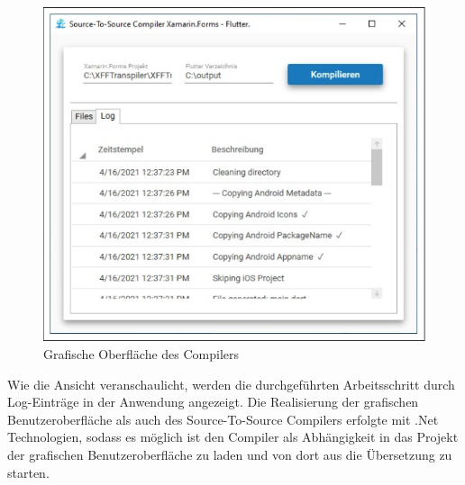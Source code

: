 \begin{figure}[!ht]
 \includegraphics[width=\textwidth,keepaspectratio]{Images/Implementation/UiScreenshot.png}
 \caption{Grafische Oberfläche des Compilers}
 \label{fig:CompilerUI}
\end{figure}

Wie die Ansicht veranschaulicht, werden die durchgeführten Arbeitsschritt durch Log-Einträge in der Anwendung angezeigt.
Die Realisierung der grafischen Benutzeroberfläche als auch des Source-To-Source Compilers erfolgte mit  .Net Technologien,  sodass es möglich ist den Compiler als Abhängigkeit in das Projekt der grafischen Benutzeroberfläche zu laden und von dort aus die Übersetzung zu starten.  



